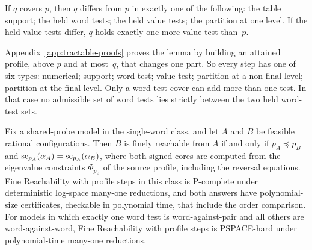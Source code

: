 \begin{center}
\end{center}

\begin{lemma}\label{lem:covers}
If $q$ covers $p$, then $q$ differs from $p$ in exactly one of the
following: the table support; the held word tests; the held value tests;
the partition at one level. If the held value tests differ, $q$ holds
exactly one more value test than~$p$.
\end{lemma}

Appendix~\ref{app:tractable-proofs} proves the lemma by building an attained
profile, above $p$ and at most~$q$, that changes one part. So every step has one of six types: numerical; support;
word-test; value-test; partition at a non-final level; partition at the
final level. Only a word-test cover can add more than one test. In that
case no admissible set of word tests lies strictly between the two held
word-test sets.

\begin{theorem}\label{thm:directed}
Fix a shared-probe model in the single-word class, and let $A$ and $B$ be
feasible rational configurations. Then $B$ is finely reachable from $A$ if
and only if $p_A\preceq p_B$ and $\operatorname{sc}_{p_A}(\alpha_A)=\operatorname{sc}_{p_A}(\alpha_B)$,
where both signed cores are computed from the eigenvalue constraints
$\Phi_{p_A}$ of the source profile, including the reversal equations. Fine
Reachability with profile steps in this class is P-complete under
deterministic log-space many-one reductions, and both answers have
polynomial-size certificates, checkable in polynomial time, that include
the order comparison. For models in which exactly one word test is
word-against-pair and all others are word-against-word, Fine Reachability
with profile steps is PSPACE-hard under polynomial-time many-one
reductions.
\end{theorem}

